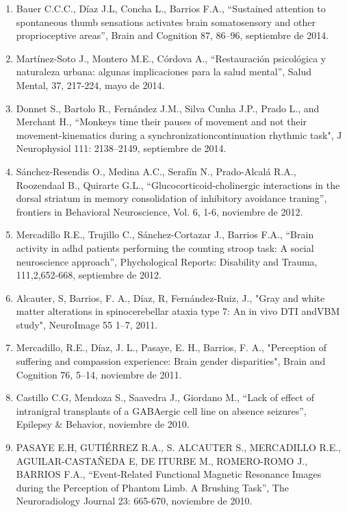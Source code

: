 \begin{enumerate}
\item Bauer C.C.C., Díaz J.L, Concha L., Barrios F.A., “Sustained attention to spontaneous thumb sensations activates brain 
somatosensory and other proprioceptive areas”, Brain and Cognition 87, 86–96, septiembre de 2014.

\item Martínez-Soto J., Montero M.E., Córdova A., “Restauración psicológica y naturaleza urbana: algunas implicaciones para 
la salud mental”, Salud Mental, 37, 217-224, mayo de 2014.

\item Donnet S., Bartolo R., Fernández J.M., Silva Cunha J.P., Prado L., and Merchant H., “Monkeys time their pauses of 
movement and not their movement-kinematics during a synchronizationcontinuation rhythmic task", J Neurophysiol 111: 
2138–2149, septiembre de 2014.

\item Sánchez-Resendis O., Medina A.C., Serafín N., Prado-Alcalá R.A., Roozendaal B., Quirarte G.L., 
“Glucocorticoid-cholinergic interactions in the dorsal striatum in memory consolidation of inhibitory avoidance traning”, 
frontiers in Behavioral Neuroscience, Vol. 6, 1-6, noviembre de 2012.

\item Mercadillo R.E., Trujillo C., Sánchez-Cortazar J., Barrios F.A., “Brain activity in adhd patients performing the 
counting stroop task: A social neuroscience approach”, Phychological Reports: Disability and Trauma, 111,2,652-668, septiembre de 2012.

\item Alcauter, S, Barrios, F. A., Díaz, R, Fernández-Ruiz, J., "Gray and white matter alterations in spinocerebellar 
ataxia 
type 7: An in vivo DTI andVBM study", NeuroImage 55 1–7, 2011.

\item Mercadillo, R.E., Díaz, J. L., Pasaye, E. H., Barrios, F. A., "Perception of suffering and compassion experience: 
Brain 
gender disparities", Brain and Cognition 76, 5–14, noviembre de 2011.

\item Castillo C.G, Mendoza S., Saavedra J., Giordano M., “Lack of effect of intranigral transplants of a GABAergic cell 
line 
on absence seizures”, Epilepsy \& Behavior, noviembre de 2010.

\item PASAYE E.H, GUTIÉRREZ R.A., S. ALCAUTER S., MERCADILLO R.E., AGUILAR-CASTAÑEDA E, DE ITURBE M., ROMERO-ROMO J., 
BARRIOS 
F.A., “Event-Related Functional Magnetic Resonance Images during the Perception of Phantom Limb. A Brushing Task”, The 
Neuroradiology Journal 23: 665-670, noviembre de 2010.


\end{enumerate}

